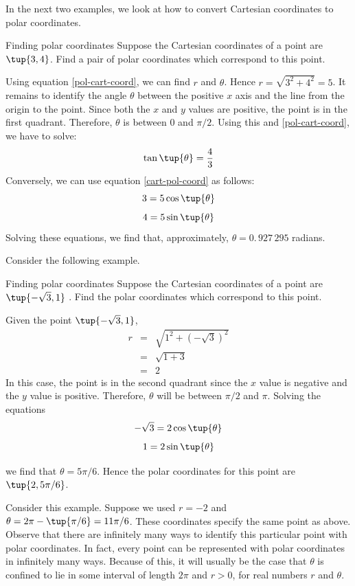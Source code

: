 In the next two examples, we look at how to convert Cartesian coordinates to polar coordinates. 

\begin{example}{Finding polar coordinates}{}
Suppose the Cartesian coordinates of a point are $\tup{3,4}$. Find
a pair of polar coordinates which correspond to this point.
\end{example}

\begin{solution}
Using equation \ref{pol-cart-coord}, we can find $r$ and $\theta$. Hence $r=\sqrt{3^{2}+4^{2}}=5$. It remains to identify the angle $\theta$ between the positive $x$ axis and the line from the origin to the point. Since both the $x$ and $y$ values are positive, the point is in the
first quadrant. Therefore, $\theta$ is between $0$ and $\pi/2$. 
Using this and \ref{pol-cart-coord}, we have to solve:
\[
\tan\tup{\theta }=\frac{4}{3}
\]
Conversely, we can use equation \ref{cart-pol-coord} as follows:
\[
3=5\cos \tup{\theta } 
\]
\[
4 = 5\sin \tup{\theta } 
\]
Solving these equations, we find that, 
approximately, $\theta =0.\, 927\,295$ radians.
\end{solution}

Consider the following example.

\begin{example}{Finding polar coordinates}{}
Suppose the Cartesian coordinates of a point are $\tup{-\sqrt{3},1}$
. Find the polar coordinates which correspond to this point.
\end{example}

\begin{solution}
Given the point $\tup{-\sqrt{3}, 1}$, 
\begin{eqnarray*}
r &=& \sqrt{ 1^2 + (-\sqrt{3})^2}\\
&=& \sqrt{1 + 3}\\
&=&2
\end{eqnarray*}
 In this case, the point is in the second quadrant since the $x$ value is negative and the $y$ value is positive. Therefore, $\theta$ will be between $\pi/2$ and $\pi$.
Solving the equations
\[
-\sqrt{3}= 2 \cos \tup{\theta}
\]
\[
1 = 2 \sin \tup{\theta} 
\]

we find that $\theta = 5\pi /6$.
Hence the polar coordinates for this point are $\tup{2, 5\pi /6 }$.
\end{solution}

Consider this example. Suppose we used $r=-2$ and $\theta =2\pi -\tup{\pi /6} = 11\pi /6$. These coordinates specify the same point as above. Observe that there are infinitely many ways to identify this
particular point with polar coordinates. In fact, every point can be represented with polar coordinates in infinitely many ways. Because of this, it will usually be
the case that $\theta $ is confined to lie in some interval
of length $2\pi $ and $r>0$, for real numbers $r$ and $\theta$. 


